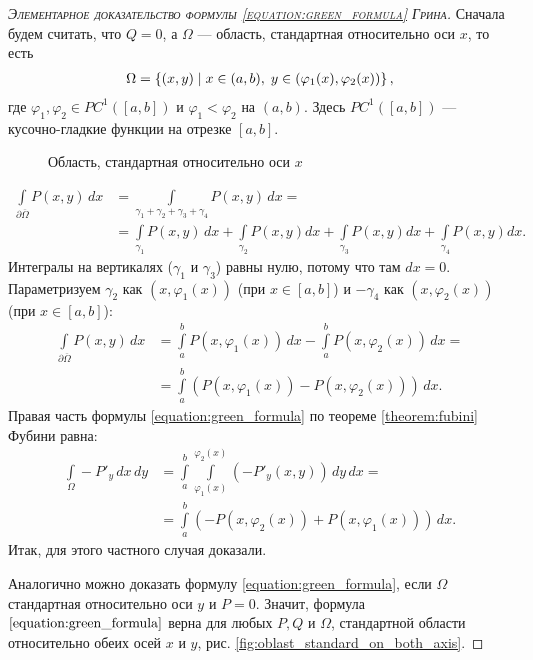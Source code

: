 \begin{proof}[\normalfont\textsc{Элементарное доказательство формулы \eqref{equation:green_formula} Грина}]
 Сначала будем считать, что $Q = 0$, а $\Omega$ --- область, стандартная относительно оси $x$, то есть \begin{align*}
  \Omega = \left\{ (x, y) \;\middle|\; x \in (a, b),\; y \in (\varphi_1(x), \varphi_2(x)) \right\}
 ,\end{align*} где $\varphi_1, \varphi_2 \in PC^{1}([a, b])$ и $\varphi_1 < \varphi_2$ на $(a, b)$. Здесь $PC^{1}([a,b])$ --- кусочно-гладкие функции на отрезке $[a,b]$.

\begin{figure}[ht]
    \centering
    \caption{Область, стандартная относительно оси $x$}
    \label{fig:oblast_elementary_on_ox}
\end{figure}

\begin{align*}
 \int\limits_{\partial \overline \Omega} P(x,y) \, dx  &= \int\limits_{\gamma_1 + \gamma_2 + \gamma_3 + \gamma_4} P(x,y) \, dx = \\
 &= \int\limits_{\gamma_1} P(x,y)\,dx + \int\limits_{\gamma_2} P(x,y) dx + \int\limits_{\gamma_3} P(x,y) dx + \int\limits_{\gamma_4} P(x,y) dx
.\end{align*} Интегралы на вертикалях ($\gamma_1$ и $\gamma_3$) равны нулю, потому что там $dx = 0$.  Параметризуем $\gamma_2$ как $(x, \varphi_1(x))$ (при $x \in [a,b]$) и $-\gamma_4$ как $(x, \varphi_2(x))$ (при $x \in [a,b]$):
\begin{align*}
 \int\limits_{\partial \overline \Omega} P(x,y)\,dx &= \int\limits_{a}^{b} P(x, \varphi_1(x)) \, dx - \int\limits_{a}^{b} P(x, \varphi_2(x)) \, dx  = \\
 &= \int\limits_{a}^{b} (P(x, \varphi_1(x)) - P(x, \varphi_2(x))) \, dx 
.\end{align*} Правая часть формулы \eqref{equation:green_formula} по теореме \ref{theorem:fubini} Фубини равна:
\begin{align*}
 \int\limits_{\Omega} -P'_y \, dx \, dy &= \int\limits_{a}^{b} \int\limits_{\varphi_1(x)}^{\varphi_2(x)} (-P'_y(x,y)) \, dy \, dx = \\
 &= \int\limits_{a}^{b} \left( -P(x, \varphi_2(x)) + P(x, \varphi_1(x)) \right) \, dx 
.\end{align*} Итак, для этого частного случая доказали.

Аналогично можно доказать формулу \eqref{equation:green_formula}, если $\Omega$ стандартная относительно оси $y$ и $P = 0$.
Значит, формула $\eqref{equation:green_formula}$ верна для любых $P, Q$ и $\Omega$, стандартной области относительно обеих осей $x$ и $y$, рис. \ref{fig:oblast_standard_on_both_axis}.


\end{proof}
